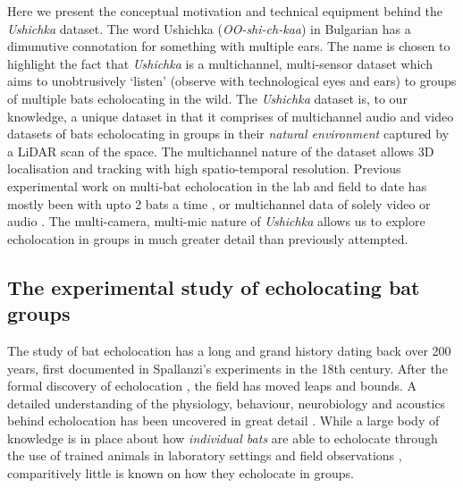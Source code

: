 \documentclass[
]{book}
\begin{document}
Here we present the conceptual motivation and technical equipment behind the \emph{Ushichka} dataset. The word Ushichka (\emph{OO-shi-ch-kaa}) in Bulgarian has a dimunutive connotation for something with multiple ears. The name is chosen to highlight the fact that \emph{Ushichka} is a multichannel, multi-sensor dataset which aims to unobtrusively `listen' (observe with technological eyes and ears) to groups of multiple bats echolocating in the wild. The \emph{Ushichka} dataset is, to our knowledge, a unique dataset in that it comprises of multichannel audio and video datasets of bats echolocating in groups in their \emph{natural environment} captured by a LiDAR scan of the space. The multichannel nature of the dataset allows 3D localisation and tracking with high spatio-temporal resolution. Previous experimental work on multi-bat echolocation in the lab and field to date has mostly been with upto 2 bats a time \citep{goetze2016a, giuggioli2015a, necknig2011between, fawcett2015clutter, fawcett2015echolocation}, or multichannel data of solely video or audio \citep{theriault2010a, lin2016a}. The multi-camera, multi-mic nature of \emph{Ushichka} allows us to explore echolocation in groups in much greater detail than previously attempted.

\hypertarget{the-experimental-study-of-echolocating-bat-groups}{%
\subsection{The experimental study of echolocating bat groups}\label{the-experimental-study-of-echolocating-bat-groups}}

The study of bat echolocation has a long and grand history dating back over 200 years, first documented in Spallanzi's experiments in the 18th century.
After the formal discovery of echolocation \citep{griffin1958a, Dijkgraaf1946}, the field has moved leaps and bounds. A detailed understanding of the physiology, behaviour, neurobiology and acoustics behind echolocation has been uncovered in great detail \citep{popper1995hearing, Fenton2016}. While a large body of knowledge is in place about how \emph{individual bats} are able to echolocate through the use of trained animals in laboratory settings and field observations \citep{Fenton2016}, comparitively little is known on how they echolocate in groups\citep{ulanovsky2008a}.
\end{document}
